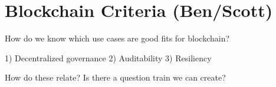 \section{Blockchain Criteria (Ben/Scott)}

How do we know which use cases are good fits for blockchain?

1) Decentralized governance
2) Auditability
3) Resiliency

How do these relate?
Is there a question train we can create?